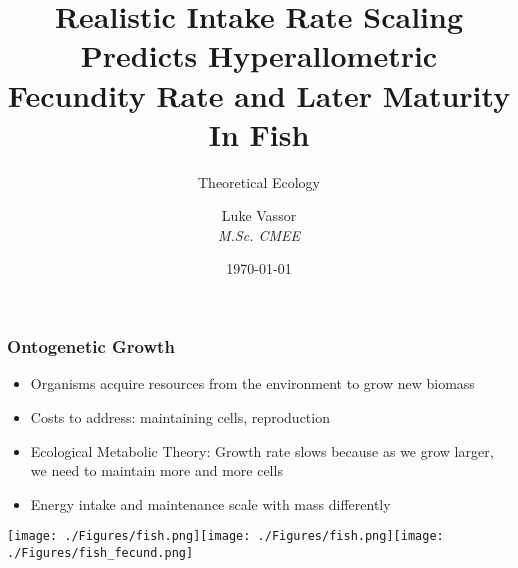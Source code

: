 \documentclass[handout]{beamer}
\institute{\texttt{[image: logo.png]}}
\title{Realistic Intake Rate Scaling Predicts Hyperallometric Fecundity Rate and Later Maturity In Fish}
\subtitle{Theoretical Ecology}
\author{Luke Vassor \\ \textit{M.Sc. CMEE}}
\date{\today}
\begin{document}
 
\frame{\titlepage}


\begin{frame}
	\frametitle{Ontogenetic Growth}
	\begin{itemize}
		\item Organisms acquire resources from the environment to grow new biomass
		\item Costs to address: maintaining cells, reproduction
		\item Ecological Metabolic Theory: Growth rate slows because as we grow larger, we need to maintain more and more cells
		\item Energy intake and maintenance scale with mass differently
	\end{itemize}
	\centering
	\texttt{[image: ./Figures/fish.png]}\hspace{0.8cm}\texttt{[image: ./Figures/fish.png]}\hspace{0.8cm}\texttt{[image: ./Figures/fish\_fecund.png]}
\end{frame}
\end{document}
